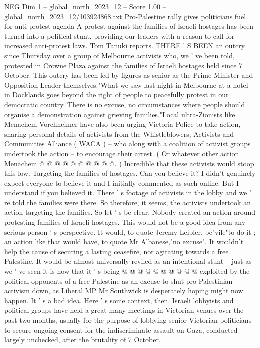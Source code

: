 \begin{textsample}{NEG Dim 1 – global\_north\_2023\_12 – Score 1.00 – global\_north\_2023\_12/103924868.txt}  \label{ex:f1_neg_363}
Pro-Palestine rally gives politicians fuel for anti-protest agenda A protest against the families of Israeli hostages has been turned into a political stunt, providing our leaders with a reason to call for increased anti-protest laws.
Tom Tanuki reports.
THERE ' S BEEN an outcry since Thursday over a group of Melbourne activists who, we ' ve been told, protested in Crowne Plaza against the families of Israeli hostages held since 7 October.
This outcry has been led by figures as senior as the Prime Minister and Opposition Leader themselves."What we saw last night in Melbourne at a hotel in Docklands goes beyond the right of people to peacefully protest in our democratic country.
There is no excuse, no circumstances where people should organise a demonstration against grieving families."Local ultra-Zionists like Menachem Vorchheimer have also been urging Victoria Police to take action, sharing personal details of activists from the Whistleblowers, Activists and Communities Alliance ( WACA ) -- who along with a coalition of activist groups undertook the action -- to encourage their arrest. ( Or whatever other action Menachem @ @ @ @ @ @ @ @ @ @. ) Incredible that these activists would stoop this low.
Targeting the families of hostages.
Can you believe it?
I didn't genuinely expect everyone to believe it and I initially commented as such online.
But I understand if you believed it.
There ' s footage of activists in the lobby and we ' re told the families were there.
So therefore, it seems, the activists undertook an action targeting the families.
So let ' s be clear.
Nobody created an action around protesting families of Israeli hostages.
This would not be a good idea from any serious person ' s perspective.
It would, to quote Jeremy Leibler, be"vile"to do it ; an action like that would have, to quote Mr Albanese,"no excuse".
It wouldn't help the cause of securing a lasting ceasefire, nor agitating towards a free Palestine.
It would be almost universally reviled as an intentional stunt -- just as we ' ve seen it is now that it ' s being @ @ @ @ @ @ @ @ @ @ exploited by the political opponents of a free Palestine as an excuse to shut pro-Palestinian activism down, as Liberal MP Mr Southwick is desperately hoping might now happen.
It ' s a bad idea.
Here ' s some context, then.
Israeli lobbyists and political groups have held a great many meetings in Victorian venues over the past two months, usually for the purpose of lobbying senior Victorian politicians to secure ongoing consent for the indiscriminate assault on Gaza, conducted largely unchecked, after the brutality of 7 October.

\end{textsample}
